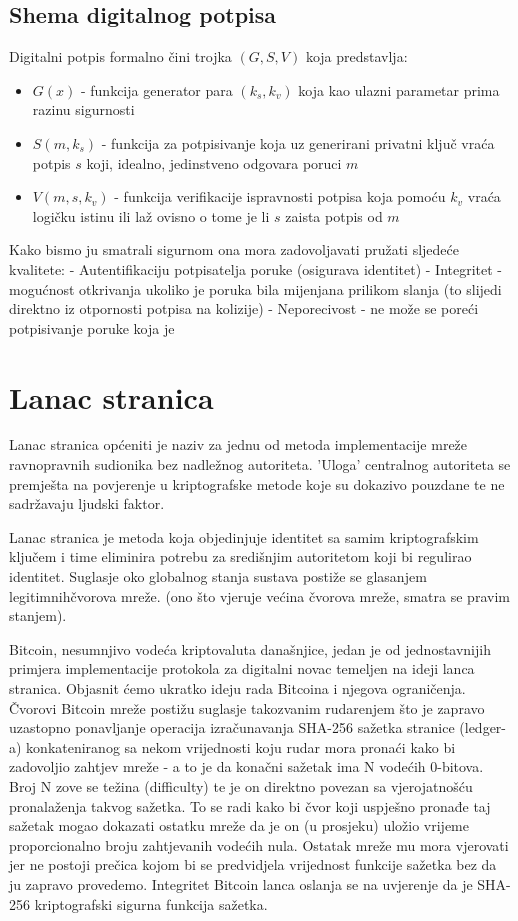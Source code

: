 \documentclass[utf8, zavrsni]{fer}
\begin{document}
\section{Shema digitalnog potpisa}
Digitalni potpis formalno čini trojka $(G, S, V)$ koja predstavlja:
\begin{itemize}
	\item $G(x)$ - funkcija generator para $(k_{s}, k_{v})$ koja kao ulazni parametar prima razinu sigurnosti
	\item $S(m, k_{s})$ - funkcija za potpisivanje koja uz generirani privatni ključ vraća potpis $s$ koji, idealno, jedinstveno odgovara poruci $m$
	\item $V(m, s, k_{v})$ - funkcija verifikacije ispravnosti potpisa koja pomoću $k_{v}$ vraća logičku istinu ili laž ovisno o tome je li $s$ zaista potpis od $m$
\end{itemize}
Kako bismo ju smatrali sigurnom ona mora zadovoljavati pružati sljedeće kvalitete:
- Autentifikaciju potpisatelja poruke (osigurava identitet)
- Integritet - mogućnost otkrivanja ukoliko je poruka bila mijenjana prilikom slanja (to slijedi direktno iz otpornosti potpisa na kolizije)
- Neporecivost - ne može se poreći potpisivanje poruke koja je

\chapter{Lanac stranica}
Lanac stranica općeniti je naziv za jednu od metoda implementacije mreže ravnopravnih sudionika bez nadležnog autoriteta. 'Uloga' centralnog autoriteta se premješta na povjerenje u kriptografske metode koje su dokazivo pouzdane te ne sadržavaju ljudski faktor.

Lanac stranica je metoda koja objedinjuje identitet sa samim kriptografskim ključem i time eliminira potrebu za središnjim autoritetom koji bi regulirao identitet. Suglasje oko globalnog stanja sustava postiže se glasanjem legitimnih\footnotemark čvorova mreže. (ono što vjeruje većina čvorova mreže, smatra se pravim stanjem).

Bitcoin, nesumnjivo vodeća kriptovaluta današnjice, jedan je od jednostavnijih primjera implementacije protokola za digitalni novac temeljen na ideji lanca stranica. Objasnit ćemo ukratko ideju rada Bitcoina i njegova ograničenja. Čvorovi Bitcoin mreže postižu suglasje takozvanim rudarenjem što je zapravo uzastopno ponavljanje operacija izračunavanja SHA-256 sažetka stranice (ledger-a) konkateniranog sa nekom vrijednosti koju rudar mora pronaći kako bi zadovoljio zahtjev mreže - a to je da konačni sažetak ima N vodećih 0-bitova. Broj N zove se težina (difficulty) te je on direktno povezan sa vjerojatnošću pronalaženja takvog sažetka. To se radi kako bi čvor koji uspješno pronađe taj sažetak mogao dokazati ostatku mreže da je on (u prosjeku) uložio vrijeme proporcionalno broju zahtjevanih vodećih nula. Ostatak mreže mu mora vjerovati jer ne postoji prečica kojom bi se predvidjela vrijednost funkcije sažetka bez da ju zapravo provedemo. Integritet Bitcoin lanca oslanja se na uvjerenje da je SHA-256 kriptografski sigurna funkcija sažetka.
\end{document}
